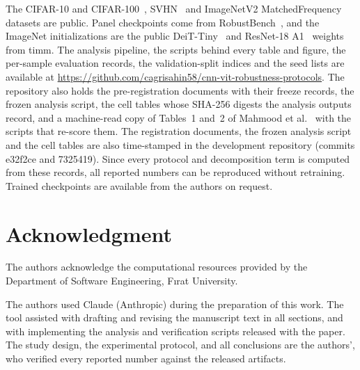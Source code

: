 \documentclass{ieeeaccess}
\begin{document}
The CIFAR-10 and CIFAR-100~\cite{krizhevsky2009learning}, SVHN~\cite{netzer2011reading} and ImageNetV2 MatchedFrequency~\cite{recht2019imagenet} datasets are public. Panel checkpoints come from RobustBench~\cite{croce2021robustbench}, and the ImageNet initializations are the public DeiT-Tiny~\cite{touvron2021training} and ResNet-18 A1~\cite{wightman2021resnet} weights from timm. The analysis pipeline, the scripts behind every table and figure, the per-sample evaluation records, the validation-split indices and the seed lists are available at \url{https://github.com/cagrisahin58/cnn-vit-robustness-protocols}. The repository also holds the pre-registration documents with their freeze records, the frozen analysis script, the cell tables whose SHA-256 digests the analysis outputs record, and a machine-read copy of Tables~1 and~2 of Mahmood et al.~\cite{mahmood2021robustness} with the scripts that re-score them. The registration documents, the frozen analysis script and the cell tables are also time-stamped in the development repository (commits e32f2ce and 7325419). Since every protocol and decomposition term is computed from these records, all reported numbers can be reproduced without retraining. Trained checkpoints are available from the authors on request.

\section*{Acknowledgment}
The authors acknowledge the computational resources provided by the Department of Software Engineering, F{\i}rat University.

The authors used Claude (Anthropic) during the preparation of this work. The tool assisted with drafting and revising the manuscript text in all sections, and with implementing the analysis and verification scripts released with the paper. The study design, the experimental protocol, and all conclusions are the authors', who verified every reported number against the released artifacts.



\end{document}
